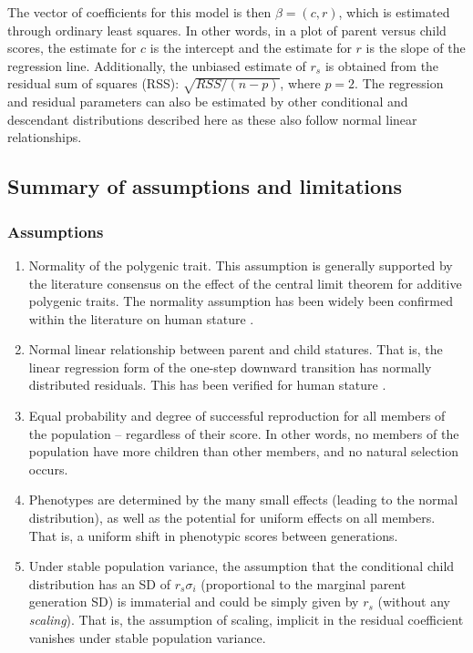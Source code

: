 \documentclass[a4paper,11pt]{article} %
\begin{document}
The vector of coefficients for this model is then $\beta = (c, r)$, which is estimated through ordinary least squares. In other words, in a plot of parent versus child scores, the estimate for $c$ is the intercept and the estimate for $r$ is the slope of the regression line. Additionally, the unbiased estimate of $r_s$ is obtained from the residual sum of squares (RSS): $\sqrt{RSS / (n-p)}$, where $p = 2$. The regression and residual parameters can also be estimated by other conditional and descendant distributions described here as these also follow normal linear relationships.



\subsection{Summary of assumptions and limitations}

\subsubsection*{Assumptions}
\begin{enumerate}
\item Normality of the polygenic trait. This assumption is generally supported by the literature consensus on the effect of the central limit theorem for additive polygenic traits. The normality assumption has been widely been confirmed within the literature on human stature \cite{luo}.
\item Normal linear relationship between parent and child statures. That is, the linear regression form of the one-step downward transition has normally distributed residuals. This has been verified for human stature \cite{luo}.
\item Equal probability and degree of successful reproduction for all members of the population -- regardless of their score. In other words, no members of the population have more children than other members, and no natural selection occurs. 
\item Phenotypes are determined by the many small effects (leading to the normal distribution), as well as the potential for uniform effects on all members. That is, a uniform shift in phenotypic scores between generations.
\item Under stable population variance, the assumption that the conditional child distribution has an SD of $r_s \sigma_i$ (proportional to the marginal parent generation SD) is immaterial and could be simply given by $r_s$ (without any \emph{scaling}). That is, the assumption of scaling, implicit in the residual coefficient vanishes under stable population variance. 
\end{enumerate}
\end{document}
